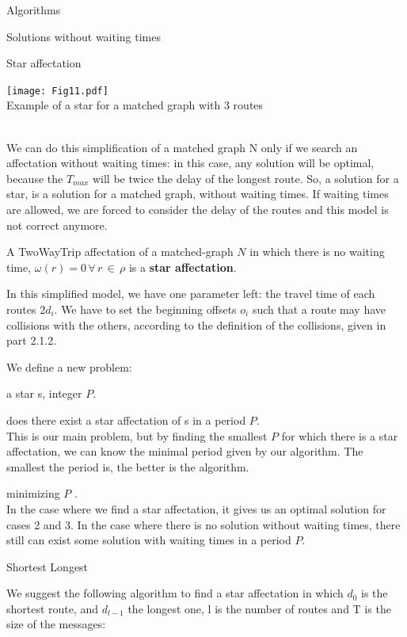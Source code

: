 \documentclass[a4paper,10pt]{report}
\begin{document}
\begin{chapter}{Algorithms}
\begin{section}{Solutions without waiting times}
\begin{subsection}{Star affectation}
{{\begin{center}
\texttt{[image: Fig11.pdf]}\\
Example of a star for a matched graph with 3 routes
\end{center}


}}\\


We can do this simplification of a matched graph N only if we search an affectation without waiting times: in this case, any solution
will be optimal, because the $T_{max}$ will be twice the delay of the longest route. So, a solution for a star, is a solution for a matched
graph, without waiting times. If waiting times are allowed, we are forced to consider the delay of the routes and this model is not
correct anymore.

A TwoWayTrip affectation of a matched-graph $N$ in which there is no waiting time, $\omega(r) = 0 \,\forall\, r \,\in\, \rho$ is a {\bf star affectation}.

In this simplified model, we have one parameter left: the travel time of each routes $2d_i$.
We have to set the beginning offsets $o_i$ such that a route may have collisions with the others, 
according to the definition of the collisions, given in part 2.1.2.


We define a new problem: 



 a star s, integer $P$.

 does there exist a star affectation of s in a period $P$.\\

This is our main problem, but by finding the smallest $P$ for which there is a star affectation, we can know 
the minimal period given by our algorithm. The smallest the period is, the better is the algorithm.


 minimizing $P$ .\\

In the case where we find a star affectation, it gives us an optimal solution for cases 2 and 3.
In the case where there is no solution without waiting times, there still can exist some solution with waiting times in 
a period $P$.
\end{subsection}
\begin{subsection}{Shortest Longest}
 
We suggest the following algorithm to find a star affectation in which $d_0$ is the shortest route, and $d_{l-1}$ the longest one, 
l is the number of routes and T is the size of the messages:


\end{subsection}
\end{section}
\end{chapter}
\end{document}
